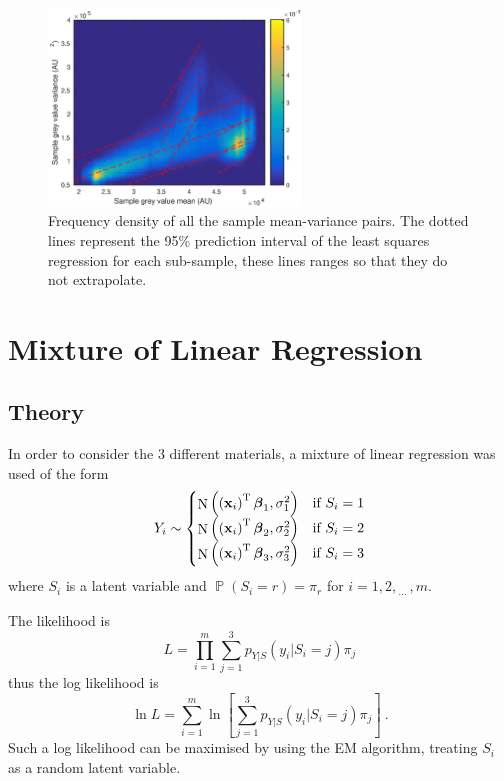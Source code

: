 \documentclass[12pt]{report}
\DeclareMathOperator{\prob}{\mathbb{P}}
\DeclareMathOperator{\normal}{N}
\newcommand{\T}{^\textup{T}}
\newcommand{\dotdotdot}{_{\phantom{.}\cdots}}
\newcommand{\vect}[1]{\mathbf{#1}}
\newcommand{\vectGreek}[1]{\boldsymbol{#1}}
\begin{document}
\begin{figure}
	\centering
	\includegraphics[width=0.6\textwidth]{figures/meanVar/subsample.eps}
	\caption{Frequency density of all the sample mean-variance pairs. The dotted lines represent the 95\% prediction interval of the least squares regression for each sub-sample, these lines ranges so that they do not extrapolate.} 
\end{figure}

\section{Mixture of Linear Regression}
\subsection{Theory}
In order to consider the 3 different materials, a mixture of linear regression was used of the form
\begin{equation}
Y_i\sim
\begin{cases}
\normal\left(\left(\vect{x}_i\right)\T\vectGreek{\beta}_1,\sigma_1^2\right) & \text{if }S_i=1\\ 
\normal\left(\left(\vect{x}_i\right)\T\vectGreek{\beta}_2,\sigma_2^2\right) & \text{if }S_i=2\\ 
\normal\left(\left(\vect{x}_i\right)\T\vectGreek{\beta}_3,\sigma_3^2\right) & \text{if }S_i=3\\
\end{cases}
\end{equation}
where $S_i$ is a latent variable and $\prob\left(S_i=r\right)=\pi_r$ for $i=1,2,\dotdotdot,m$.

The likelihood is
\begin{equation}
L=\prod_{i=1}^m\sum_{j=1}^3p_{Y|S}\left(y_i|S_i=j\right)\pi_j
\end{equation}
thus the log likelihood is
\begin{equation}
\ln{L}=\sum_{i=1}^m\ln\left[
\sum_{j=1}^3p_{Y|S}\left(y_i|S_i=j\right)\pi_j
\right] \ .
\end{equation}
Such a log likelihood can be maximised by using the EM algorithm, treating $S_i$ as a random latent variable.
\end{document}
